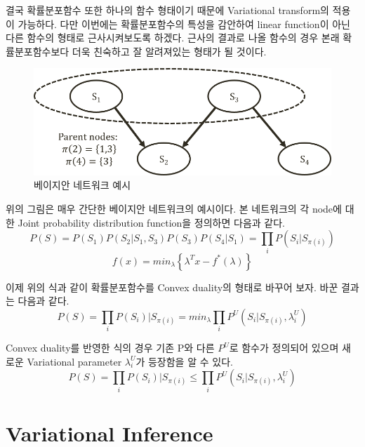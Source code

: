 \documentclass[draft=false]{oblivoir}
\begin{document}
결국 확률분포함수 또한 하나의 함수 형태이기 때문에 Variational transform의 적용이 가능하다. 다만 이번에는 확률분포함수의 특성을 감안하여 linear function이 아닌 다른 함수의 형태로 근사시켜보도록 하겠다. 근사의 결과로 나올 함수의 경우 본래 확률분포함수보다 더욱 친숙하고 잘 알려져있는 형태가 될 것이다. 


\begin{figure}[ht] \centering 
\includegraphics[scale=0.6]{fig11_4.png} 
\caption{ 베이지안 네트워크 예시}
\label{fig:11-4}
\end{figure}

위의 그림은 매우 간단한 베이지안 네트워크의 예시이다. 본 네트워크의 각 node에 대한 Joint probability distribution function을 정의하면 다음과 같다.
\begin{equation}
P(S) = P(S_{1})P(S_{2}|S_{1},S_{3})P(S_{3})P(S_{4}|S_{1}) =\prod_{i}P(S_{i}|S_{\pi(i)})
\label{eq:11-2-6-1}
\end{equation}
\begin{equation}
f(x) = min_{\lambda}\left\{ \lambda^{T}x - f^{*}( \lambda )\right\}\nonumber
\label{eq:11-2-7-1}
\end{equation}

이제 위의 식과 같이 확률분포함수를 Convex duality의 형태로 바꾸어 보자. 바꾼 결과는 다음과 같다. 
\begin{equation}
P(S) = \prod_{i}P(S_{i})|S_{\pi(i)} =min_{\lambda}\prod_{i}P^{U}(S_{i}|S_{\pi(i)}, \lambda^{U}_{i})
\label{eq:11-2-8-1}
\end{equation}

Convex duality를 반영한 식의 경우 기존 P와 다른 $P^U$로 함수가 정의되어 있으며 새로운 Variational parameter $\lambda^{U}_{i}$가 등장함을 알 수 있다. 
\begin{equation}
P(S) = \prod_{i}P(S_{i})|S_{\pi(i)} \leq \prod_{i}P^{U}(S_{i}|S_{\pi(i)},\lambda^{U}_{i})
\label{eq:11-2-9-1}
\end{equation}

\section{Variational Inference}
\end{document}
